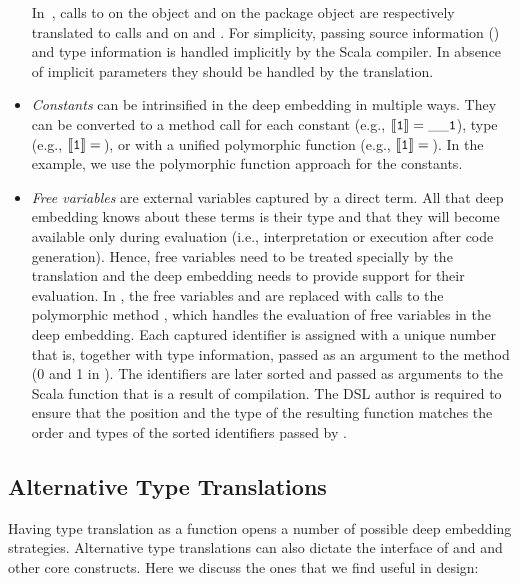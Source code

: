 \begin{itemize}
 In~, calls to  on the object
  and  on the package object 
 are respectively translated to calls  and  on
  and . For simplicity, passing source
 information () and type information  is
 handled implicitly by the Scala compiler. In absence of implicit parameters
 they should be handled by the translation.

\item \emph{Constants} can be intrinsified in the deep embedding in multiple ways. They can be converted to a method call for each constant (e.g., $\left\llbracket \mathtt{1} \right\rrbracket = \mathtt{\_\_1}$), type (e.g., $\left\llbracket \mathtt{1} \right\rrbracket = \,$), or with a unified polymorphic function (e.g., $\left\llbracket \mathtt{1} \right\rrbracket = \,$). In the example, we use the polymorphic function approach for the constants.

\item \emph{Free variables} are external variables captured by a direct \edsl{}
  term.  All that deep embedding knows about these terms is their type and that
  they will become available only during evaluation (i.e., interpretation or
  execution after code generation).  Hence, free variables need to be treated
  specially by the translation and the deep embedding needs to provide support
  for their evaluation.  In , the free variables
   and  are replaced with calls to the polymorphic method
  , which handles the evaluation of free variables in the deep
  embedding. Each captured identifier is assigned with a unique number that
  is, together with type information, passed as an argument to the  method
   (0 and 1 in ).
  The identifiers are later sorted and passed as arguments to the Scala function that is a result
  of \edsl compilation. The DSL author is required to ensure that the position and the type
  of the resulting function matches the order and types of the sorted identifiers passed by \tool.
\end{itemize}


\subsection{Alternative Type Translations}
\label{sec:alternative-type-translations}

Having type translation as a function opens a number of possible deep embedding strategies. Alternative type translations can also dictate the interface of  and  and other core \edsl{} constructs. Here we discuss the ones that we find useful in \edsl{} design:

